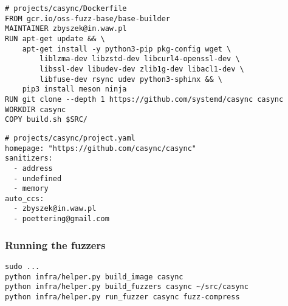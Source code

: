 \documentclass[serif]{beamer}
\begin{document}
\begin{frame}[fragile]
\small
\begin{verbatim}
# projects/casync/Dockerfile    
FROM gcr.io/oss-fuzz-base/base-builder
MAINTAINER zbyszek@in.waw.pl
RUN apt-get update && \
    apt-get install -y python3-pip pkg-config wget \
        liblzma-dev libzstd-dev libcurl4-openssl-dev \
        libssl-dev libudev-dev zlib1g-dev libacl1-dev \
        libfuse-dev rsync udev python3-sphinx && \
    pip3 install meson ninja
RUN git clone --depth 1 https://github.com/systemd/casync casync
WORKDIR casync
COPY build.sh $SRC/
\end{verbatim}

\begin{verbatim}
# projects/casync/project.yaml
homepage: "https://github.com/casync/casync"
sanitizers:
  - address
  - undefined
  - memory
auto_ccs:
  - zbyszek@in.waw.pl
  - poettering@gmail.com
\end{verbatim}
\end{frame}

\begin{frame}[fragile]
  \frametitle{Running the fuzzers}
  
  \begin{verbatim}
sudo ...
python infra/helper.py build_image casync
python infra/helper.py build_fuzzers casync ~/src/casync
python infra/helper.py run_fuzzer casync fuzz-compress
  \end{verbatim}
\end{frame}
\end{document}
